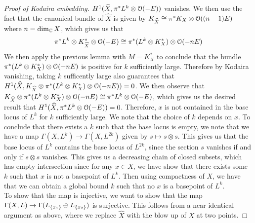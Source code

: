 \begin{proof}[Proof of Kodaira embedding]
$H^1(\widehat{X},\pi^*L^k\otimes\mathcal{O}(-E))$ vanishes. We then use the fact that the
canonical bundle of $\widehat{X}$ is given by
$K_{\widehat{X}} \cong \pi^*K_X \otimes \mathcal{O}((n-1)E)$ where $n = \dim_{\mathbb{C}} X$,
which gives us that
\[
\pi^*L^k\otimes K^*_{\widehat{X}}\otimes\mathcal{O}(-E)\cong\pi^*(L^k\otimes K^*_X)\otimes\mathcal{O}(-nE)
\]
We then apply the previous lemma with $M = K^*_X$ to conclude that
the bundle $\pi^*(L^k\otimes K^*_X)\otimes\mathcal{O}(-nE)$ is positive for $k$ sufficiently
large. Therefore by Kodaira vanishing, taking $k$ sufficently large also
guarantees that
$H^1(\widehat{X},K_{\widehat{X}} \otimes \pi^*(L^k\otimes K^*_X)\otimes\mathcal{O}(-nE)) = 0$.
We then observe that
$K_{\widehat{X}}\otimes\pi^*(L^k\otimes K^*_X)\otimes\mathcal{O}(-nE)\cong\pi^*L^k\otimes\mathcal{O}(-E)$,
which gives us the desired result that $H^1(\widehat{X},\pi^*L^k\otimes\mathcal{O}(-E)) = 0$.
Therefore, $x$ is not contained in the base locus of $L^k$ for $k$ sufficiently large.
We note that the choice of $k$ depends on $x$. To conclude that there exists
a $k$ such that the base locus is empty, we note that we have a map
$\Gamma(X,L^k) \to \Gamma(X,L^{2k})$ given by $s \mapsto s \otimes s$.
This gives us that the base locus of $L^k$ contains the base locus of $L^{2k}$,
since the section $s$ vanishes if and only if $s \otimes s$ vanishes.
This gives us a decreasing chain of closed subsets, which has empty intersection
since for any $x \in X$, we have show that there exists some $k$ such that
$x$ is not a basepoint of $L^k$. Then using compactness of $X$, we have
that we can obtain a global bound $k$ such that no $x$ is a basepoint of $L^k$. \\

To show that the map is injective, we want to show that the map
$\Gamma(X,L) \to \Gamma(L_{\left\lbrace x_1 \right\rbrace} \oplus L_{\left\lbrace x_2 \right\rbrace})$ is surjective.
This follows from a near identical argument as above, where we replace
$\widehat{X}$ with the blow up of $X$ at two points.
\end{proof}
%